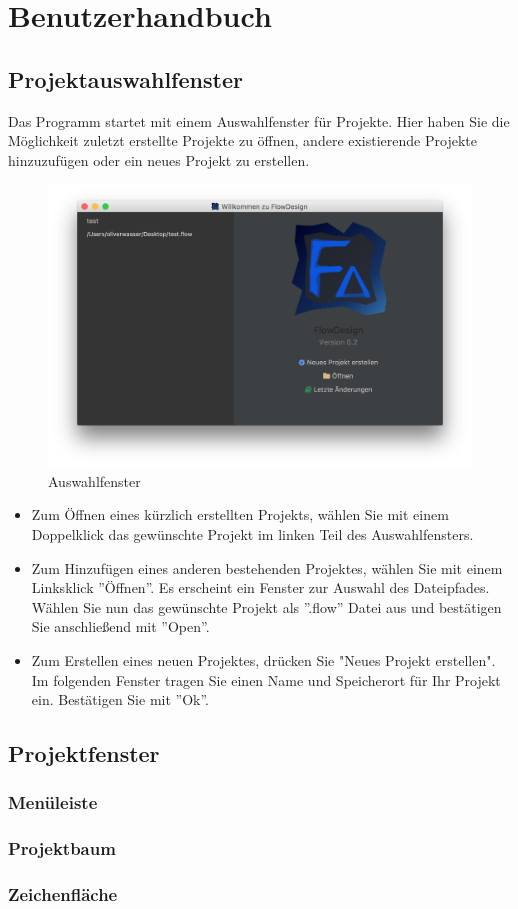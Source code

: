 
\section{Benutzerhandbuch}

\subsection{Projektauswahlfenster}
Das Programm startet mit einem Auswahlfenster für Projekte. Hier haben Sie die Möglichkeit zuletzt erstellte Projekte zu öffnen, andere existierende Projekte hinzuzufügen oder ein neues Projekt zu erstellen. 

\begin{figure}[h!]
	\centering
	\includegraphics[width=1.0\textwidth]{Auswahlfenster.png}
	\caption{Auswahlfenster}
\end{figure}

\begin{itemize}
\item Zum Öffnen eines kürzlich erstellten Projekts, wählen Sie mit einem Doppelklick das gewünschte Projekt im linken Teil des Auswahlfensters. 
\item Zum Hinzufügen eines anderen bestehenden Projektes, wählen Sie mit einem Linksklick ''Öffnen''. Es erscheint ein Fenster zur Auswahl des Dateipfades. Wählen Sie nun das gewünschte Projekt als ''.flow'' Datei aus und bestätigen Sie anschließend mit ''Open''. 
\item Zum Erstellen eines neuen Projektes, drücken Sie "Neues Projekt erstellen". Im folgenden Fenster tragen Sie einen Name und Speicherort für Ihr Projekt ein. Bestätigen Sie mit ''Ok''.  
\end{itemize}



\subsection{Projektfenster}
\subsubsection{Menüleiste}
\subsubsection{Projektbaum}
\subsubsection{Zeichenfläche}
